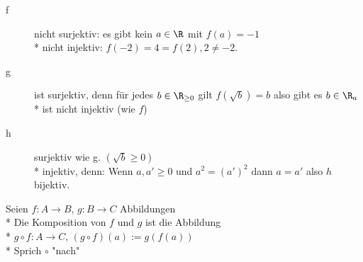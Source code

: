 \begin{description}
\item[f]{
\hspace{6mm}nicht surjektiv: es gibt kein $a\in\R$ mit $f(a)=-1$\\*
nicht injektiv: $f(-2)=4=f(2), 2\neq -2.$}
%
\item[g]{
\hspace{5mm}ist surjektiv, denn für jedes $b \in \R_{\geq 0}$ gilt $f( \sqrt{b} ) = b$ also gibt es $b \in \R_a$\\*
 ist nicht injektiv (wie $f$)}
%
\item[h]{
\hspace{5mm}surjektiv wie g. $(\sqrt{b} \geq 0)$\\*
injektiv, denn: Wenn $a, a' \geq 0$ und $a^2 = (a')^2$ dann $a = a'$ also $h$ bijektiv.}
\end{description}

Seien $f:A→B$, $g:B→C$ Abbildungen\\*
Die Komposition von $f$ und $g$ ist die Abbildung\\*
$g \circ  f: A→C$, $(g \circ f)(a):=g(f(a))$\\*
Sprich $\circ$ "nach"
%

